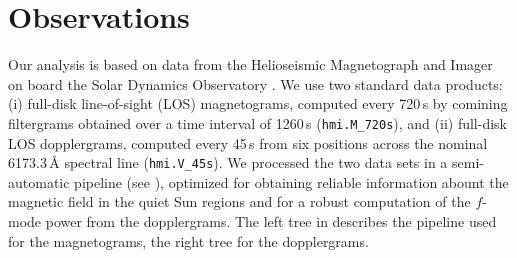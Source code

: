 \documentclass{aa}
\begin{document}

%
%
%
%
%
%
%


\section{Observations}\label{pipeline}

Our analysis is based on data from the Helioseismic Magnetograph and Imager \cite[HMI,][]{2012SoPh..275..207S,2012SoPh..275..229S} on board the Solar Dynamics Observatory \cite[SDO,][]{2012SoPh..275....3P}. We use two standard data products: (i) full-disk line-of-sight (LOS) magnetograms, computed every 720\,s by comining filtergrams obtained over a time interval of 1260\,s (\texttt{hmi.M\_720s}), and (ii) full-disk LOS dopplergrams, computed every 45\,s from six positions across the nominal 6173.3\,\AA{} spectral line (\texttt{hmi.V\_45s}). We processed the two data sets in a semi-automatic pipeline (see ), optimized for obtaining reliable information abount the magnetic field in the quiet Sun regions and for a robust computation of the $f$-mode power from the dopplergrams. The left tree in  describes the pipeline used for the magnetograms, the right tree for the dopplergrams.
\end{document}
